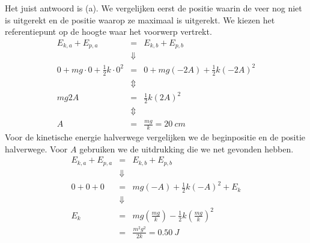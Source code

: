 \documentclass{ximera}
\begin{document}
\begin{exercise}
\begin{oplossing}
	Het juist antwoord is (a). We vergelijken eerst de positie waarin de veer nog niet is uitgerekt en de positie waarop ze maximaal is uitgerekt. We kiezen het referentiepunt op de hoogte waar het voorwerp vertrekt.
	\begin{eqnarray*}
		E_{k,a}+E_{p,a}&=&E_{k,b}+E_{p,b}\\
		&\Downarrow&\\
		0+mg\cdot0+\frac{1}{2}k\cdot0^2&=&0+mg(-2A)+\frac{1}{2}k(-2A)^2\\
		&\Updownarrow&\\
		mg2A&=&\frac{1}{2}k(2A)^2\\
		&\Updownarrow&\\
		A&=&\frac{mg}{k}=\SI{20}{cm}
	\end{eqnarray*}
	Voor de kinetische energie halverwege vergelijken we de beginpositie en de positie halverwege. Voor $A$ gebruiken we de uitdrukking die we net gevonden hebben.
	\begin{eqnarray*}
		E_{k,a}+E_{p,a}&=&E_{k,b}+E_{p,b}\\
		&\Downarrow&\\
		0+0+0&=&mg(-A)+\frac{1}{2}k(-A)^2+E_k\\
		&\Downarrow&\\
		E_k&=&mg\left(\frac{mg}{k}\right)-\frac{1}{2}k\left(\frac{mg}{k}\right)^2\\
		&=&\frac{m^2g^2}{2k}=\SI{0,50}{J}
	\end{eqnarray*}
\end{oplossing}
\end{exercise}
\end{document}
